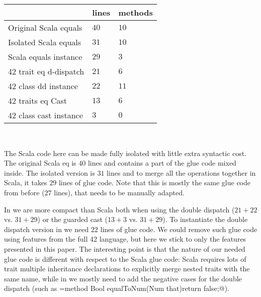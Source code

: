\noindent\!\!
\begin{minipage}{0.46\textwidth}
\begin{tabular}{l |l |l}
&                              lines  &   methods\\
\hline
Original Scala equals       &    $40$   &   $10$\\
Isolated Scala equals       &   $31$    &   $10$\\
Scala equals instance       &    $29$   &    $3$\\
42 trait eq d-dispatch      &   $21$
   &    $6$\\
42 class dd instance        &    $22$   &   $11$\\
42 traits eq Cast            &   $13$
   &    $6$\\
42 class cast instance      &     $3$   &    $0$\\
\end{tabular}
\end{minipage}\quad\ \ \ \ 
\begin{minipage}{0.5\textwidth}
The Scala code here can be made fully isolated with little
extra syntactic cost. The original Scala eq is $40$ lines and
contains a part of the glue code mixed inside.
The isolated version is $31$ lines and to merge all the operations together in Scala, it
takes $29$ lines of glue code. Note that this
is mostly the same glue code from before ($27$ lines), that
needs to be manually adapted.
\end{minipage}

In \name we are
more compact than Scala both when using the double dispatch ($21+22$ vs. $31+29$)
or the guarded cast ($13+3$ vs. $31+29$).
To instantiate the double dispatch 
version in \name we need $22$ lines of glue code.
We could remove such glue code using 
features from the full 42 language, but here we stick to only the features presented in this paper.
The interesting point is that the nature of our needed glue code 
is different with respect to the Scala glue code:
Scala requires lots of trait multiple inheritance declarations to explicitly merge
nested traits with the same name, while in \name we mostly need 
to add the negative cases for the double dispatch (such as
\Q@Sum={method Bool equalToNum(Num that){return false;}}@).


